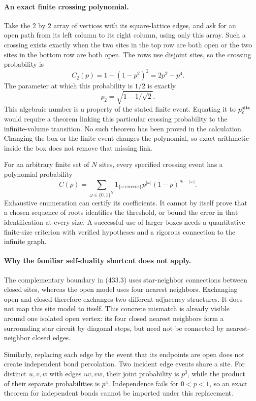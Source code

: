 \documentclass[11pt]{article}
\begin{document}
\paragraph{An exact finite crossing polynomial.}
Take the $2$ by $2$ array of vertices with its square-lattice edges, and ask for an open path from its left column to its right column, using only this array. Such a crossing exists exactly when the two sites in the top row are both open or the two sites in the bottom row are both open. The rows use disjoint sites, so the crossing probability is
\[
 C_2(p)=1-(1-p^2)^2=2p^2-p^4. \tag{433.5}
\]
The parameter at which this probability is $1/2$ is exactly
\[
 p_2=\sqrt{1-1/\sqrt2}.
\]
This algebraic number is a property of the stated finite event. Equating it to $p_c^{\rm site}$ would require a theorem linking this particular crossing probability to the infinite-volume transition. No such theorem has been proved in the calculation. Changing the box or the finite event changes the polynomial, so exact arithmetic inside the box does not remove that missing link.

For an arbitrary finite set of $N$ sites, every specified crossing event has a polynomial probability
\[
 C(p)=\sum_{\omega\in\{0,1\}^N}
       1_{\{\omega\text{ crosses}\}}p^{|\omega|}(1-p)^{N-|\omega|}.
 \tag{433.6}
\]
Exhaustive enumeration can certify its coefficients. It cannot by itself prove that a chosen sequence of roots identifies the threshold, or bound the error in that identification at every size. A successful use of larger boxes needs a quantitative finite-size criterion with verified hypotheses and a rigorous connection to the infinite graph.

\paragraph{Why the familiar self-duality shortcut does not apply.}
The complementary boundary in (433.3) uses star-neighbor connections between closed sites, whereas the open model uses four nearest neighbors. Exchanging open and closed therefore exchanges two different adjacency structures. It does not map this site model to itself. This concrete mismatch is already visible around one isolated open vertex: its four closed nearest neighbors form a surrounding star circuit by diagonal steps, but need not be connected by nearest-neighbor closed edges.

Similarly, replacing each edge by the event that its endpoints are open does not create independent bond percolation. Two incident edge events share a site. For distinct $u,v,w$ with edges $uv,vw$, their joint probability is $p^3$, while the product of their separate probabilities is $p^4$. Independence fails for $0<p<1$, so an exact theorem for independent bonds cannot be imported under this replacement.
\end{document}
